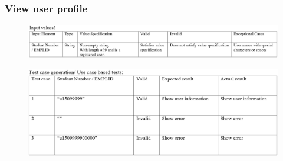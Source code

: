 \documentclass[english]{article}
\begin{document}
\subsubsection{View user profile}
\begin{figure}[ht!]
\hspace*{-2.5cm}
\includegraphics[width=180mm]{8.png}
\end{figure}
\begin{figure}[ht!]
\hspace*{-2.5cm}
\includegraphics[width=180mm]{ViewTestCase.png}
\end{figure}
\end{document}
